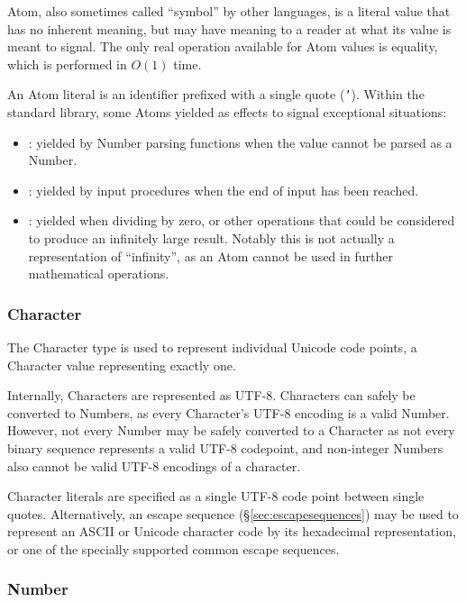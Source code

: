 Atom, also sometimes called ``symbol'' by other languages, is a literal
value that has no inherent meaning, but may have meaning to a reader at
what its value is meant to signal. The only real operation available for
Atom values is equality, which is performed in $O(1)$ time.

An Atom literal is an identifier prefixed with a single quote (\texttt{'}).
Within the standard library, some Atoms yielded as effects to signal
exceptional situations:

\begin{itemize}
    \item {}: yielded by Number parsing functions when the value
    cannot be parsed as a Number.
    \item {}: yielded by input procedures when the end of input
    has been reached.
    \item {}: yielded when dividing by zero, or other operations
    that could be considered to produce an infinitely large result. Notably
    this is not actually a representation of ``infinity'', as an Atom
    cannot be used in further mathematical operations.
\end{itemize}

\subsubsection{Character}

The Character type is used to represent individual Unicode code points,
a Character value representing exactly one.

Internally, Characters are represented as UTF-8. Characters can safely
be converted to Numbers, as every Character's UTF-8 encoding is a valid
Number. However, not every Number may be safely converted to a Character
as not every binary sequence represents a valid UTF-8 codepoint, and
non-integer Numbers also cannot be valid UTF-8 encodings of a character.

Character literals are specified as a single UTF-8 code point between
single quotes. Alternatively, an escape sequence (\S\ref{sec:escapesequences})
may be used to represent an ASCII or Unicode character code by its hexadecimal
representation, or one of the specially supported common escape sequences.

\subsubsection{Number}

